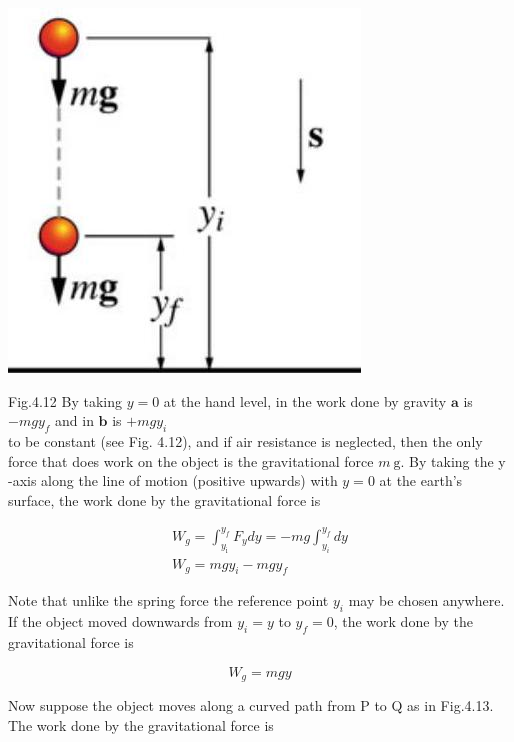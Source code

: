 \documentclass[10pt]{article}
\begin{document}
\begin{center}
\includegraphics[max width=\textwidth]{2024_09_13_db1f357d2aad0a03eb2eg-067}
\end{center}

Fig.4.12 By taking $y=0$ at the hand level, in the work done by gravity $\mathbf{a}$ is $-m g y_{f}$ and in $\mathbf{b}$ is $+m g y_{i}$\\
to be constant (see Fig. 4.12), and if air resistance is neglected, then the only force that does work on the object is the gravitational force $m \mathrm{~g}$. By taking the y -axis along the line of motion (positive upwards) with $y=0$ at the earth's surface, the work done by the gravitational force is

$$
\begin{gathered}
W_{g}=\int_{y_{\mathrm{i}}}^{y_{f}} F_{y} d y=-m g \int_{y_{i}}^{y_{f}} d y \\
W_{g}=m g y_{i}-m g y_{f}
\end{gathered}
$$

Note that unlike the spring force the reference point $y_{i}$ may be chosen anywhere. If the object moved downwards from $y_{i}=y$ to $y_{f}=0$, the work done by the gravitational force is

$$
W_{g}=m g y
$$

Now suppose the object moves along a curved path from P to Q as in Fig.4.13. The work done by the gravitational force is
\end{document}
